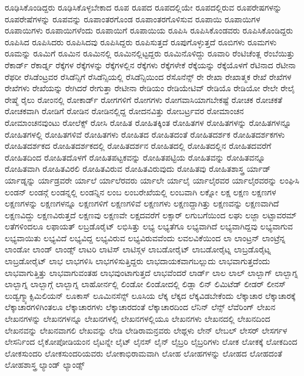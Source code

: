 {ರೂಢಿಸಿಕೊಂಡಿದ್ದರು
ರೂಢಿಸಿಕೊಳ್ಳಬೇಕಾದ
ರೂಪ
ರೂಪದ
ರೂಪದಲ್ಲಿಯೇ
ರೂಪದಲ್ಲಿರುವ
ರೂಪರೇಷಗಳನ್ನು
ರೂಪರೇಷೆಗಳನ್ನು
ರೂಪವನ್ನು
ರೂಪಾಂತರಗೊಂಡ
ರೂಪಾಂತರಗೊಳಿಸುವ
ರೂಪಾಯಿ
ರೂಪಾಯಿಗಳ
ರೂಪಾಯಿಗಳು
ರೂಪಾಯಿಗಳೆಂದು
ರೂಪಾಯಿಗೆ
ರೂಪಾಯಿಯ
ರೂಪಿಸಿ
ರೂಪಿಸಿಕೊಂಡವರು
ರೂಪಿಸಿಕೊಂಡಿದ್ದರು
ರೂಪಿಸಿದ
ರೂಪಿಸಿದರು
ರೂಪಿಸಿದವು
ರೂಪಿಸಿದ್ದರು
ರೂಪಿಸುತ್ತದೆ
ರೂಪುಗೊಳ್ಳುತ್ತದೆ
ರೂಬಿಗಳು
ರೂಮಗಳು
ರೂಮನ್ನು
ರೂಮಿಗೆ
ರೂಮಿನ
ರೂಮಿನಲ್ಲಿ
ರೂಮಿನಲ್ಲಿಟ್ಟದ್ದರು
ರೂಮಿನೊಳಿದ್ದು
ರೂವಾರಿ
ರೆಂಟಿಚೆಂತ್ಲ
ರೆಂಬೆಯಿತ್ತು
ರೆಕಾರ್ಡ್
ರೆಕಾರ್ಡ್ನ
ರೆಕ್ಕೆಗಳ
ರೆಕ್ಕೆಗಳನ್ನು
ರೆಕ್ಕೆಗಳಲ್ಲಿನ
ರೆಕ್ಕೆಗಳು
ರೆಕ್ಕೆಗಳೇಕೆ
ರೆಕ್ಕೆಯನ್ನು
ರೆಕ್ಕೆಯೊಳಗೆ
ರೆಟಿನಾದ
ರೆಟೀನಾ
ರೆಫರೀ
ರೆಸಿಡೆಂಟ್ರವರ
ರೆಸಿಡೆನ್ಸಿಗೆ
ರೆಸಿಡೆನ್ಸಿಯಲ್ಲಿ
ರೆಸಿಡೆನ್ಸಿಯಿಂದ
ರೆಸೊನೆನ್ಸ್
ರೇ
ರೇಖಾ
ರೇಖಾತ್ಮಕ
ರೇಖೆ
ರೇಖೆಗಳ
ರೇಖೆಗಳು
ರೇಖೆಯನ್ನು
ರೇಗಿದರೆ
ರೇಗುತ್ತಾ
ರೇಟೀನಾ
ರೇಡಿಯಂ
ರೇಡಿಯೇಟಿವ್
ರೇಡಿಯೊ
ರೇಡಿಯೋ
ರೇಲೇ
ರೇಲೈ
ರೇಷ್ಮೆ
ರೈಲು
ರೋಂನಲ್ಲಿ
ರೋಕಾರ್ಡ್
ರೋಗಗಳಿಗೆ
ರೋಗಗಳು
ರೋಗವಾಸಿಯಾಗಬೇಕಷ್ಟೆ
ರೋಚಕ
ರೋಚಕತೆ
ರೋಚಕವಾಗಿ
ರೋಡಿಗೆ
ರೋಡಿನ
ರೋಡಿನಲ್ಲಿದ್ದ
ರೋದನವಿತ್ತು
ರೋಬರ್ಟ್ರವರ
ರೋಮಾಂಚನ
ರೋಮಾಂಚನವುಂಟು
ರೋಲೆಕ್ಸ್
ರೋಸಿ
ರೋಹಿತ
ರೋಹಿತಕ್ಕಿಂತ
ರೋಹಿತಗಳ
ರೋಹಿತಗಳನ್ನು
ರೋಹಿತಗಳನ್ನೂ
ರೋಹಿತಗಳಲ್ಲಿ
ರೋಹಿತಗಳಿವೆ
ರೋಹಿತಗಳು
ರೋಹಿತದ
ರೋಹಿತದಂತೆ
ರೋಹಿತದರ್ಶಕ
ರೋಹಿತದರ್ಶಕಗಳು
ರೋಹಿತದರ್ಶಕದ
ರೋಹಿತದರ್ಶಕದಲ್ಲಿ
ರೋಹಿತದರ್ಶನ
ರೋಹಿತದಲ್ಲಿ
ರೋಹಿತದಲ್ಲಿನ
ರೋಹಿತದವರೆಗೆ
ರೋಹಿತದಿಂದ
ರೋಹಿತದೊಳಗೆ
ರೋಹಿತಪಟ್ಟಕವನ್ನು
ರೋಹಿತಪಟ್ಟಿಯ
ರೋಹಿತವನ್ನು
ರೋಹಿತವನ್ನೂ
ರೋಹಿತವಾಗಿ
ರೋಹಿತವಿರಲಿ
ರೋಹಿತವಿರುವ
ರೋಹಿತವಿರುವುದು
ರೋಹಿತವು
ರೋಹಿತಶಾಸ್ತ್ರ
ರ್ಯಾಡ್
ರ್ಯಾಡ್ನನ್ನು
ರ್ಯಾಡ್ರವರೇ
ರ್ಯಾಲೆ
ರ್ಯಾಲೆರವರು
ರ್ಯಾಲೇ
ರ್ಯಾಲೈ
ರ್ಯಾಲೈರವರ
ರ್ಯಾಲೈರವರನ್ನು
ಲಂಘಿಸಿ
ಲಂಡನ್
ಲಂಡನ್ಗೆ
ಲಂಡನ್ನಲ್ಲಿ
ಲಂಡನ್ನಿನ
ಲಂಬ
ಲಂಬರೇಖೆಯಲ್ಲಿ
ಲಂಬವಾಗಿ
ಲಕ್ನೋ
ಲಕ್ಷ
ಲಕ್ಷಣ
ಲಕ್ಷಣಗಳ
ಲಕ್ಷಣಗಳನ್ನು
ಲಕ್ಷಣಗಳನ್ನೂ
ಲಕ್ಷಣಗಳಿಗೆ
ಲಕ್ಷಣಗಳಿವೆ
ಲಕ್ಷಣಗಳು
ಲಕ್ಷಣದ್ದಾಗಿತ್ತು
ಲಕ್ಷಣವನ್ನು
ಲಕ್ಷಣವಾಗಿದೆ
ಲಕ್ಷಣವಿದ್ದು
ಲಕ್ಷಣವಿರುತ್ತದೆ
ಲಕ್ಷಣವು
ಲಕ್ಷಣವೇ
ಲಕ್ಷದವರೆಗೆ
ಲಕ್ಸಾರ್
ಲಗುಬಗೆಯಿಂದ
ಲಘು
ಲಜ್ಜಾ
ಲಟ್ಟಾವರಮ್
ಲತೆಗಳಿಂದಲೂ
ಲಫಾಯತ್
ಲಬ್ರಡೊರೈಟ್
ಲಭಿಸಿತ್ತು
ಲಭ್ಯ
ಲಭ್ಯತೆಗೂ
ಲಭ್ಯವಾಗಿದೆ
ಲಭ್ಯವಾಗಿದ್ದವು
ಲಭ್ಯವಾಗುವ
ಲಭ್ಯವಾಯಿತು
ಲಭ್ಯವಿದೆ
ಲಭ್ಯವಿದ್ದ
ಲಭ್ಯವಿರುವ
ಲಭ್ಯವಿರುವವೆಂದು
ಲವಲವಿಕೆಯಿಂದ
ಲಾ
ಲಾಂಟ್ರನ್
ಲಾಂಟ್ರೆನ್ನ
ಲಾಂಡೋ
ಲಾಂಡ್
ಲಾಂಡ್ಸ್
ಲಾಟರಿ
ಲಾಟಿಸ್
ಲಾಟಿಸ್ಗಳ
ಲಾಬಡೋರೈಟ್
ಲಾಬಡೋರೈಟ್ನ
ಲಾಬ್ರಡೊರೈಟ್ನ
ಲಾಬ್ರಡೋರೈಟ್
ಲಾಭ
ಲಾಭಗಳಿಸಿ
ಲಾಭಗಳಿಸುತ್ತಿದ್ದರು
ಲಾಭದಾಯಕವಾಗಬಲ್ಲುದು
ಲಾಭವಾಗುತ್ತದೆಂದು
ಲಾಭವಾಗುತ್ತಿತ್ತು
ಲಾಭವಾಗುವಂತಹ
ಲಾಭವುಂಟಾಗುತ್ತದೆ
ಲಾಭವೆಂದರೆ
ಲಾರ್ಡ್
ಲಾಲ
ಲಾಲ್
ಲಾಲ್ಬಾಗ್
ಲಾಲ್ಬಾಗ್ನ
ಲಾಲ್ಬಾಗ್ನ
ಲಾಲ್ಬಾಗ್ಗೆ
ಲಾಲ್ಬಾಗ್ನ
ಲಾಹೋರ್ನಲ್ಲಿ
ಲಿಂಡೋ
ಲಿಂಡೋದಲ್ಲಿ
ಲಿಡ್ಲಾ
ಲಿನ್
ಲಿಮಿಟೆಡ್
ಲೀಡರ್
ಲೀನಸ್
ಲುಡ್ವಗ್ಮ್ಯಾಕ್ಸಿಮಿಲಿಯನ್
ಲೂಕಾಸ್
ಲೂಮಿನಸೆನ್ಸ್
ಲೂಸಿಯ
ಲೆಕ್ಕ
ಲೆಕ್ಕದ
ಲೆಕ್ಕವಿಡಬೇಕೆಂದು
ಲೆಕ್ಕಾಚಾರ
ಲೆಕ್ಕಾಚಾರಕ್ಕೆ
ಲೆಕ್ಕಾಚಾರಗಳಿಗಿಂತಲೂ
ಲೆಕ್ಕಾಚಾರಗಳು
ಲೆಕ್ಕಾಚಾರದಂತೆ
ಲೆಕ್ಕಾಚಾರದಿಂದ
ಲೆನಿನ್
ಲೆನ್ಸ್
ಲೆವೆರಿಂಗ್
ಲೇಖನ
ಲೇಖನಗಳನ್ನು
ಲೇಖನಗಳನ್ನೂ
ಲೇಖನಗಳಲ್ಲಿ
ಲೇಖನಗಳಲ್ಲಿಯೂ
ಲೇಖನಗಳು
ಲೇಖನದಲ್ಲಿ
ಲೇಖನದಿಂದ
ಲೇಖನವನ್ನು
ಲೇಖನವಾಗಲಿ
ಲೇಖವನ್ನು
ಲೇಡಿ
ಲೇಡಿರಾಮನ್ರವರು
ಲೇಥ್ಗಳು
ಲೇನ್
ಲೇಬಲ್
ಲೇಸರ್
ಲೇಸರ್ಗಳ
ಲೇಸರ್ನಿಂದ
ಲೈಕೋಪೋಡಿಯಂನ
ಲೈಟನ್ನೇ
ಲೈಟ್
ಲೈನಸ್
ಲೈನ್
ಲೈಬ್ರರಿ
ಲೈಬ್ರರಿಗಳು
ಲೋಕ
ಲೋಕಕ್ಕೆ
ಲೋಕದಿಂದ
ಲೋಕಸುಂದರಿ
ಲೋಕಸುಂದರಿಯವರು
ಲೋಕಾಭಿರಾಮವಾಗಿ
ಲೋಹ
ಲೋಹಗಳನ್ನು
ಲೋಹದ
ಲೋಹದಂತೆ
ಲೋಹಶಾಸ್ತ್ರ
ಲ್ಯಾಂಡ್
ಲ್ಯಾಂಡ್ಸ್
}
